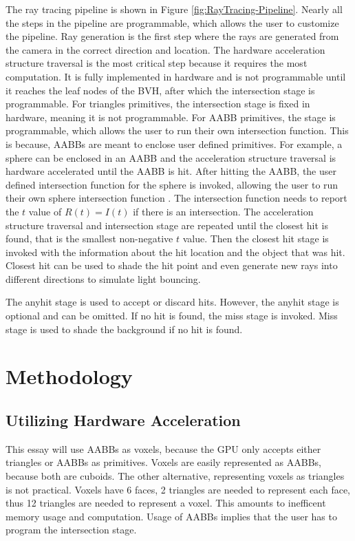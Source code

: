 \documentclass[12pt]{article}
\begin{document}
The ray tracing pipeline is shown in Figure \ref{fig:RayTracing-Pipeline}. 
Nearly all the steps in the pipeline are programmable, which allows the user to customize the pipeline.
Ray generation is the first step where the rays are generated from the camera in the correct direction and location.
The hardware acceleration structure traversal is the most critical step because it requires the most computation.
It is fully implemented in hardware and is not programmable until it reaches the leaf nodes of the BVH, after which the intersection stage is programmable.
For triangles primitives, the intersection stage is fixed in hardware, meaning it is not programmable.
For AABB primitives, the stage is programmable, which allows the user to run their own intersection function.
This is because, AABBs are meant to enclose user defined primitives.
For example, a sphere can be enclosed in an AABB and the acceleration structure traversal is hardware accelerated
until the AABB is hit. After hitting the AABB, the user defined intersection function for the sphere is invoked,
allowing the user to run their own sphere intersection function \parencite{NVIDIA:BVH-Patent}.
The intersection function needs to report the $t$ value of $R(t) = I(t)$ if there is an intersection.
The acceleration structure traversal and intersection stage are repeated until the closest hit is found,
that is the smallest non-negative $t$ value. Then the closest hit stage is invoked with the information
about the hit location and the object that was hit.
Closest hit can be used to shade the hit point and even generate new rays into different directions to simulate light bouncing. 

The anyhit stage is used to accept or discard hits. However, the anyhit stage is optional and can be omitted.
If no hit is found, the miss stage is invoked.
 Miss stage is used to shade the background if no hit is found.
\parencite{NVIDIA:RTGems2}

\section{Methodology}

\subsection{Utilizing Hardware Acceleration}

This essay will use AABBs as voxels, because the GPU only accepts either triangles or AABBs as primitives.
Voxels are easily represented as AABBs, because both are cuboids. 
The other alternative, representing voxels as triangles is not practical. Voxels have 6 faces, 2 triangles
are needed to represent each face, thus 12 triangles are needed to represent a voxel. This amounts to 
inefficent memory usage and computation. Usage of AABBs implies that the user has to program the intersection stage.
\end{document}
